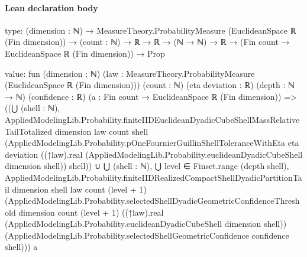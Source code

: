 \documentclass[10pt]{article}
\begin{document}
\paragraph{Lean declaration body}
\begin{ReviewVerbatim}
type:
(dimension : ℕ) →
  MeasureTheory.ProbabilityMeasure (EuclideanSpace ℝ (Fin dimension)) →
    (count : ℕ) → ℝ → ℝ → (ℕ → ℕ) → ℝ → (Fin count → EuclideanSpace ℝ (Fin dimension)) → Prop

value:
fun (dimension : ℕ) (law : MeasureTheory.ProbabilityMeasure (EuclideanSpace ℝ (Fin dimension))) (count : ℕ)
    (eta deviation : ℝ) (depth : ℕ → ℕ) (confidence : ℝ) (a : Fin count → EuclideanSpace ℝ (Fin dimension)) =>
  ((⋃ (shell : ℕ),
        AppliedModelingLib.Probability.finiteIIDEuclideanDyadicCubeShellMassRelativeTailTotalized dimension law count
          shell
          (AppliedModelingLib.Probability.pOneFournierGuillinShellToleranceWithEta eta deviation
            ((↑law).real (AppliedModelingLib.Probability.euclideanDyadicCubeShell dimension shell)) shell)) ∪
      ⋃ (shell : ℕ),
        ⋃ level ∈ Finset.range (depth shell),
          AppliedModelingLib.Probability.finiteIIDRealizedCompactShellDyadicPartitionTail dimension shell law count
            (level + 1)
            (AppliedModelingLib.Probability.selectedShellDyadicGeometricConfidenceThreshold dimension count (level + 1)
              ((↑law).real (AppliedModelingLib.Probability.euclideanDyadicCubeShell dimension shell))
              (AppliedModelingLib.Probability.selectedShellGeometricConfidence confidence shell)))
    a
\end{ReviewVerbatim}
\end{document}
